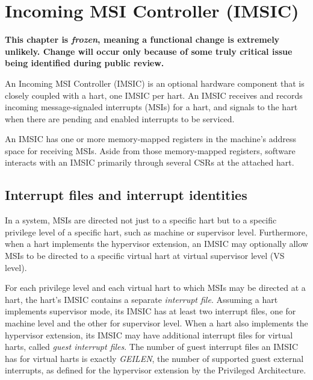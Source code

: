 
\chapter{Incoming MSI Controller (IMSIC)}
\label{ch:IMSIC}

\textbf{%
This chapter is \emph{frozen}, meaning
a functional change is extremely unlikely.
Change will occur only because of some truly critical issue
being identified during public review.%
}
\bigskip

An Incoming MSI Controller (IMSIC) is an optional {\RISCV} hardware
component that is closely coupled with a hart, one IMSIC per hart.
An IMSIC receives and records incoming message-signaled interrupts
(MSIs) for a hart, and signals to the hart when there are pending and
enabled interrupts to be serviced.

An IMSIC has one or more memory-mapped registers in the machine's
address space for receiving MSIs.
Aside from those memory-mapped registers, software interacts with an
IMSIC primarily through several {\RISCV} CSRs at the attached hart.

\section{Interrupt files and interrupt identities}
\label{sec:IMSIC-intrFilesAndIdents}

In a {\RISCV} system, MSIs are directed not just to a specific hart but
to a specific privilege level of a specific hart, such as machine or
supervisor level.
Furthermore, when a hart implements the hypervisor extension, an IMSIC
may optionally allow MSIs to be directed to a specific virtual hart at
virtual supervisor level (VS level).

For each privilege level and each virtual hart to which MSIs
may be directed at a hart, the hart's IMSIC contains a separate
\emph{interrupt file}.
Assuming a hart implements supervisor mode, its IMSIC has at least two
interrupt files, one for machine level and the other for supervisor
level.
When a hart also implements the hypervisor extension, its IMSIC may
have additional interrupt files for virtual harts,
called \emph{guest interrupt files}.
The number of guest interrupt files an IMSIC has for virtual harts is exactly
\emph{GEILEN}, the number of supported guest external interrupts,
as defined for the hypervisor extension
by the {\RISCV} Privileged Architecture.

